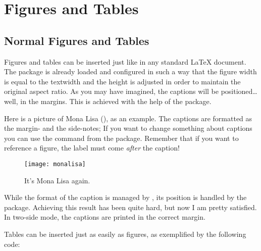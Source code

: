 \setchapterpreamble[u]{\margintoc}
\chapter{Figures and Tables}


\section{Normal Figures and Tables}

Figures and tables can be inserted just like in any standard 
\LaTeX\xspace document. The  package is already loaded 
and configured in such a way that the figure width is equal to the 
textwidth and the height is adjusted in order to maintain the original 
aspect ratio. As you may have imagined, the captions will be 
positioned\ldots well, in the margins. This is achieved with the help of 
the  package.

Here is a picture of Mona Lisa (), as an example. 
The captions are formatted as the margin- and the side-notes; If you 
want to change something about captions you can use the command 
 from the  package. Remember that if 
you want to reference a figure, the label must come \emph{after} the 
caption!

\begin{figure}[hb]
    \texttt{[image: monalisa]}
    \caption[Mona Lisa, again]{It's Mona Lisa again. \blindtext}
\end{figure}

While the format of the caption is managed by , its 
position is handled by the  package. Achieving this 
result has been quite hard, but now I am pretty satisfied. In two-side 
mode, the captions are printed in the correct margin.

Tables can be inserted just as easily as figures, as exemplified by the 
following code:


